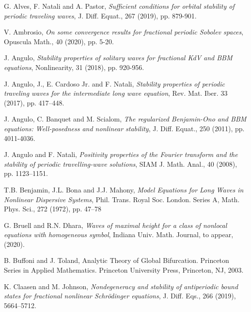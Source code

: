 \documentclass[12pt,reqno]{amsart}
\newcommand{\2}{L^2_{per}(0, T)}
\numberwithin{equation}{section}
\numberwithin{figure}{section}
\begin{document}
\begin{thebibliography}{99}




 {\sc G. Alves, F. Natali and A. Pastor}, \textit{Sufficient conditions for orbital stability of periodic traveling waves}, J. Diff. Equat., 267 (2019), pp. 879-901.

 {\sc V. Ambrosio}, \textit{On some convergence results for fractional periodic Sobolev spaces}, Opuscula Math., 40 (2020), pp. 5-20.




 {\sc J. Angulo}, \textit{Stability properties of solitary waves for fractional KdV and BBM equations}, Nonlinearity, 31 (2018), pp. 920-956.


 {\sc J. Angulo, J.,  E. Cardoso Jr. and F. Natali}, \textit{Stability properties of periodic traveling waves for the intermediate long wave equation}, Rev. Mat. Iber. 33 (2017), pp. 417--448.


 {\sc J. Angulo, C. Banquet and M. Scialom},
\textit{The regularized Benjamin-Ono and BBM equations: Well-posedness and
nonlinear stability}, J. Diff. Equat., 250 (2011), pp. 4011-4036.







 {\sc J. Angulo and F. Natali}, \textit{Positivity properties of
the Fourier transform and the stability of
periodic travelling-wave solutions}, SIAM J. Math. Anal., 40 (2008),
pp. 1123--1151.


 {\sc T.B. Benjamin, J.L. Bona and J.J. Mahony}, \textit{Model Equations for Long Waves in Nonlinear Dispersive Systems}, Phil. Trans. Royal Soc. London. Series A, Math. Phys. Sci., 272 (1972),  pp. 47–78




 {\sc G. Bruell and R.N. Dhara}, \textit{Waves of maximal height for a class of nonlocal equations with homogeneous symbol}, Indiana Univ. Math. Journal, to appear, (2020).


 {\sc B. Buffoni and J. Toland}, Analytic Theory of Global Bifurcation. Princeton Series in Applied
Mathematics. Princeton University Press, Princeton, NJ, 2003.

 {\sc K. Claasen and M. Johnson}, \textit{Nondegeneracy and stability of antiperiodic bound states for fractional
	nonlinear Schr\"{o}dinger equations}, J. Diff. Eqs., 266 (2019), 5664--5712.



\end{thebibliography}
\end{document}
